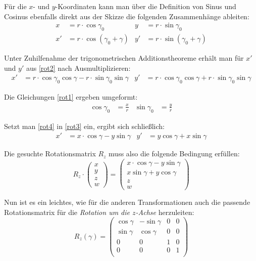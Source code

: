 Für die $x$- und $y$-Koordinaten kann man über die Definition von Sinus und Cosinus ebenfalls direkt aus der Skizze die folgenden Zusammenhänge ableiten:
\begin{align}
  x &= r \cdot \cos{\gamma_0}            &   y &= r \cdot \sin{\gamma_0} \label{rot1} \\
 x' &= r \cdot \cos{(\gamma_0 + \gamma)} &  y' &= r \cdot \sin{(\gamma_0 + \gamma)} \label{rot2}
\end{align}

Unter Zuhilfenahme der trigonometrischen Additionstheoreme erhält man für $x'$ und $y'$ aus \ref{rot2} nach Ausmultiplizieren:
\begin{align}
 \label{rot3}
 x' &= r \cdot \cos \gamma_0 \cos \gamma - r \cdot \sin \gamma_0 \sin \gamma &  y' &= r \cdot \cos \gamma_0 \cos \gamma + r \cdot \sin \gamma_0 \sin \gamma
\end{align}

Die Gleichungen \ref{rot1} ergeben umgeformt:
\begin{align}
 \label{rot4}
 \cos \gamma_0 &= \frac{x}{r} & \sin \gamma_0 &= \frac{y}{r}
\end{align}

Setzt man \ref{rot4} in \ref{rot3} ein, ergibt sich schließlich:
\begin{align}
 x' &= x \cdot \cos \gamma - y \sin \gamma &  y' &= y \cos \gamma + x \sin \gamma
\end{align}

Die gesuchte Rotationsmatrix $R_{z}$ muss also die folgende Bedingung erfüllen:
\begin{equation}
 R_{z} \cdot
 \begin{pmatrix}
  x \\
  y \\
  z \\
  w
 \end{pmatrix}
 = 
 \begin{pmatrix}
  x \cdot \cos \gamma - y \sin \gamma \\
  x \sin \gamma + y \cos \gamma \\
  z \\
  w
 \end{pmatrix}
\end{equation}

Nun ist es ein leichtes, wie für die anderen Transformationen auch die passende Rotationsmatrix für die \emph{Rotation um die $z$-Achse} herzuleiten:
\begin{equation}
 R_z{(\gamma)}
 = 
 \begin{pmatrix}
  \cos \gamma & -\sin \gamma & 0 & 0 \\
  \sin \gamma &  \cos \gamma & 0 & 0 \\
  0 & 0 & 1 & 0 \\
  0 & 0 & 0 & 1 \\
 \end{pmatrix}
\end{equation}

